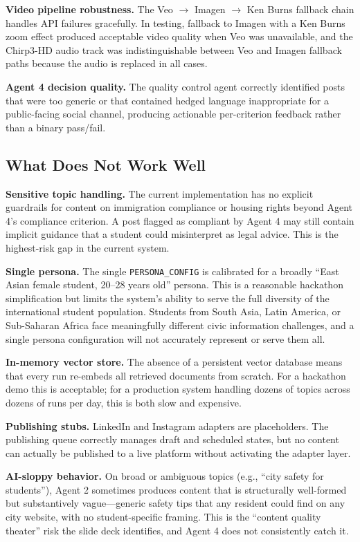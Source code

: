 \documentclass[12pt, letterpaper]{article}
\begin{document}
\textbf{Video pipeline robustness.} The Veo $\to$ Imagen $\to$ Ken Burns fallback chain
handles API failures gracefully. In testing, fallback to Imagen with a Ken Burns zoom
effect produced acceptable video quality when Veo was unavailable, and the Chirp3-HD
audio track was indistinguishable between Veo and Imagen fallback paths because the
audio is replaced in all cases.

\textbf{Agent 4 decision quality.} The quality control agent correctly identified posts
that were too generic or that contained hedged language inappropriate for a public-facing
social channel, producing actionable per-criterion feedback rather than a binary pass/fail.

\subsection{What Does Not Work Well}

\textbf{Sensitive topic handling.} The current implementation has no explicit guardrails
for content on immigration compliance or housing rights beyond Agent 4's compliance
criterion. A post flagged as compliant by Agent 4 may still contain implicit guidance
that a student could misinterpret as legal advice. This is the highest-risk gap in the
current system.

\textbf{Single persona.} The single \texttt{PERSONA\_CONFIG} is calibrated for a broadly
``East Asian female student, 20--28 years old'' persona. This is a reasonable hackathon
simplification but limits the system's ability to serve the full diversity of the
international student population. Students from South Asia, Latin America, or Sub-Saharan
Africa face meaningfully different civic information challenges, and a single persona
configuration will not accurately represent or serve them all.

\textbf{In-memory vector store.} The absence of a persistent vector database means that
every run re-embeds all retrieved documents from scratch. For a hackathon demo this is
acceptable; for a production system handling dozens of topics across dozens of runs per
day, this is both slow and expensive.

\textbf{Publishing stubs.} LinkedIn and Instagram adapters are placeholders. The
publishing queue correctly manages draft and scheduled states, but no content can
actually be published to a live platform without activating the adapter layer.

\textbf{AI-sloppy behavior.} On broad or ambiguous topics (e.g., ``city safety for
students''), Agent 2 sometimes produces content that is structurally well-formed but
substantively vague---generic safety tips that any resident could find on any city
website, with no student-specific framing. This is the ``content quality theater'' risk
the slide deck identifies, and Agent 4 does not consistently catch it.
\end{document}
